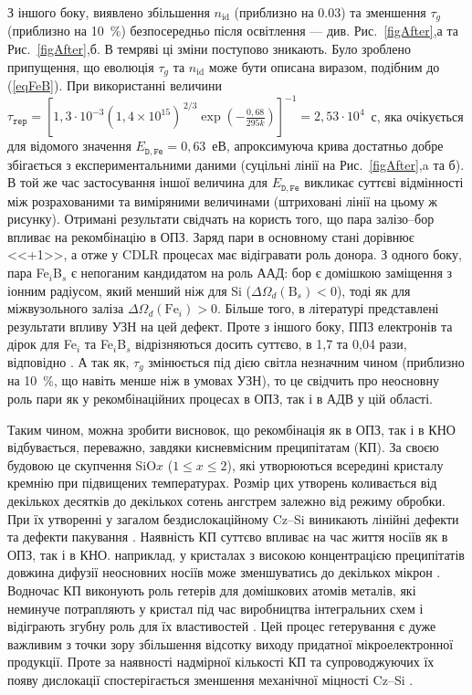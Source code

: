 З іншого боку, виявлено збільшення $n_{\mathrm{id}}$ (приблизно на 0.03) та зменшення $\tau_g$ (приблизно на 10~\%) безпосередньо після освітлення
--- див. Рис.~\ref{figAfter},а та Рис.~\ref{figAfter},б.
В темряві ці зміни поступово зникають.
Було зроблено припущення, що еволюція $\tau_g$ та $n_{\mathrm{id}}$ може бути описана виразом, подібним до (\ref{eqFeB}).
При використанні величини $\tau_{\mathtt{rep}}=\left[1,3\cdot10^{-3}(1,4\times10^{15})^{\,2/3}\exp\left(-\frac{0,68}{295k}\right)\right]^{-1}=2,53\cdot10^4$~с,
яка очікується для відомого значення $E_{\mathtt{D,Fe}}=0,63$~еВ, апроксимуюча крива достатньо добре збігається з експериментальними даними
(суцільні лінії на Рис.~\ref{figAfter},a та б).
В той же час застосування іншої величина для $E_{\mathtt{D,Fe}}$ викликає суттєві відмінності між розрахованими та виміряними величинами
(штриховані лінії на цьому ж рисунку).
Отримані результати свідчать на користь того, що пара залізо--бор впливає
на рекомбінацію в ОПЗ.
Заряд пари в основному стані дорівнює <<+1>>, а отже у CDLR процесах має відігравати роль донора.
З одного боку, пара Fe$_i$B$_s$ є непоганим кандидатом на роль ААД:
бор є домішкою заміщення з іонним радіусом, який менший ніж для Si ($\Delta\Omega_d (\mbox{B}_s)<0$),
тоді як для міжвузольного заліза $\Delta\Omega_d (\mbox{Fe}_i)>0$.
Більше того,  в літературі \cite{Ostapenko1995,OlikhFTT} представлені результати впливу УЗН на цей дефект.
Проте з іншого боку, ППЗ електронів та дірок для Fe$_i$ та Fe$_i$B$_s$ відрізняються досить суттєво, в 1,7 та 0,04 рази, відповідно \cite{MurphyJAP2011}.
А так як, $\tau_g$ змінюється під дією світла незначним чином (приблизно на 10~\%, що навіть менше ніж в умовах УЗН), то це свідчить про
неосновну роль пари як у рекомбінаційних процесах в ОПЗ, так і в АДВ у цій області.


Таким чином, можна зробити висновок, що рекомбінація як в ОПЗ, так і в КНО відбувається, переважно,
завдяки кисневмісним преципітатам (КП).
За своєю будовою  це скупчення SiO$x$ ($1\leq x\leq2$), які утворюються всередині кристалу кремнію при підвищених температурах.
Розмір цих утворень коливається від декількох десятків до декількох сотень ангстрем залежно від режиму обробки.
При їх утворенні у загалом бездислокаційному Cz--Si виникають лінійні дефекти та дефекти пакування \cite{SiO:Hwang,SiO:Vanhell}.
Наявність КП суттєво впливає на час життя носіїв як в ОПЗ, так і в КНО.
наприклад, у кристалах з високою концентрацією преципітатів довжина дифузії неосновних носіїв може зменшуватись до декількох мікрон \cite{SiO:Hwang}.
Водночас КП виконують роль гетерів для домішкових атомів металів, які неминуче потрапляють у кристал під час виробництва
інтегральних схем і відіграють згубну роль для їх властивостей \cite{APR:Oxigen,MSER74}.
Цей процес гетерування є дуже важливим з точки зору збільшення відсотку виходу придатної мікроелектронної продукції.
Проте за наявності надмірної кількості КП та супроводжуючих їх появу дислокації
спостерігається зменшення механічної міцності Cz--Si \cite{MSER74}.


